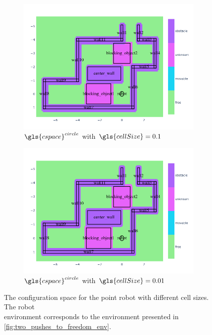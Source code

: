 \begin{figure}[H]
  \centering
  \begin{subfigure}{.49\textwidth}
    \centering
    \includegraphics[width=1.05\textwidth]{figures/planning/c_space_point_robot_grid_size_0_1}
    \caption{$\gls{cspace}^{circle}$ with $\gls{cellSize} = 0.1$}%
    \label{fig:c_space_two_pushes_small}
  \end{subfigure}
  \begin{subfigure}{.49\textwidth}
    \centering
    \includegraphics[width=1.05\textwidth]{figures/planning/c_space_point_robot_grid_size_0_01}
    \caption{$\gls{cspace}^{circle}$ with $\gls{cellSize} = 0.01$}%
    \label{fig:c_space_two_pushes_smaller}
  \end{subfigure}
  \caption{The configuration space for the point robot with different cell sizes. The robot\\environment corresponds to the environment presented in \cref{fig:two_pushes_to_freedom_env}.}
  \label{fig:two_pushes_to_freedom_conf_space}
\end{figure}

